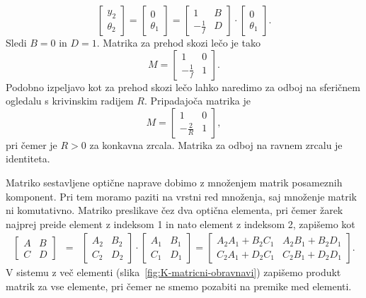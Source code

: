 \begin{equation}
\left[\begin{array}{c}
y_{2}\\
\theta_{2}
\end{array}\right]=\left[\begin{array}{c}
0\\
\theta_{1}
\end{array}\right]=\left[\begin{array}{cc}
1 & B\\
-\frac{1}{f} & D
\end{array}\right]\cdot\left[\begin{array}{c}
0\\
\theta_{1}
\end{array}\right].
\end{equation}
 Sledi $B=0$ in $D=1$. Matrika za prehod skozi lečo je tako 
\begin{equation}
M= \left[\begin{array}{cc}
1 & 0\\
-\frac{1}{f} & 1
\end{array}\right].
\end{equation}
Podobno izpeljavo kot za prehod skozi lečo lahko naredimo za odboj na sferičnem ogledalu 
s krivinskim radijem $R$. Pripadajoča matrika je 
\begin{equation}
M=\left[\begin{array}{cc}
1 & 0\\
-\frac{2}{R} & 1
\end{array}\right],
\end{equation}
pri čemer je $R>0$ za konkavna zrcala. Matrika za odboj na ravnem zrcalu je identiteta.

Matriko sestavljene optične naprave dobimo z množenjem matrik posameznih komponent. 
Pri tem moramo paziti na vrstni red množenja, saj množenje matrik ni komutativno.
Matriko preslikave čez dva optična elementa, pri čemer žarek 
najprej preide element z indeksom 1 in nato element z indeksom 2, zapišemo kot 
\begin{eqnarray}
\left[\begin{array}{cc}
A & B\\
C & D
\end{array}\right] & = & \left[\begin{array}{cc}
A_{2} & B_{2}\\
C_{2} & D_{2}
\end{array}\right]\cdot\left[\begin{array}{cc}
A_{1} & B_{1}\\
C_{1} & D_{1}
\end{array}\right]=\left[\begin{array}{cc}
A_{2}A_{1}+B_{2}C_{1} & A_{2}B_{1}+B_{2}D_{1}\\
C_{2}A_{1}+D_{2}C_{1} & C_{2}B_{1}+D_{2}D_{1}
\end{array}\right].
\end{eqnarray}
V sistemu z več elementi (slika~\ref{fig:K-matricni-obravnavi}) zapišemo
produkt matrik za vse elemente, pri čemer ne smemo pozabiti na premike med
elementi.

